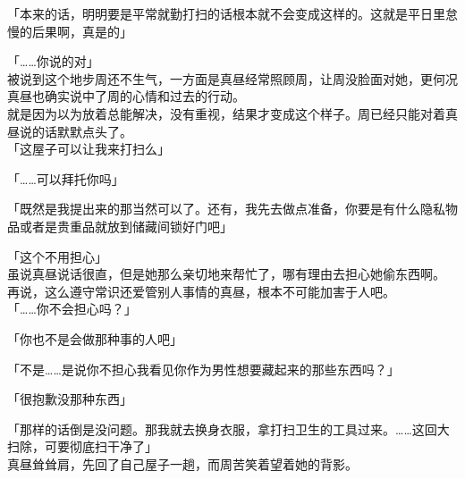 「本来的话，明明要是平常就勤打扫的话根本就不会变成这样的。这就是平日里怠慢的后果啊，真是的」

「……你说的对」\\

被说到这个地步周还不生气，一方面是真昼经常照顾周，让周没脸面对她，更何况真昼也确实说中了周的心情和过去的行动。\\

就是因为以为放着总能解决，没有重视，结果才变成这个样子。周已经只能对着真昼说的话默默点头了。\\

「这屋子可以让我来打扫么」

「……可以拜托你吗」

「既然是我提出来的那当然可以了。还有，我先去做点准备，你要是有什么隐私物品或者是贵重品就放到储藏间锁好门吧」

「这个不用担心」\\

虽说真昼说话很直，但是她那么亲切地来帮忙了，哪有理由去担心她偷东西啊。\\

再说，这么遵守常识还爱管别人事情的真昼，根本不可能加害于人吧。\\

「……你不会担心吗？」

「你也不是会做那种事的人吧」

「不是……是说你不担心我看见你作为男性想要藏起来的那些东西吗？」

「很抱歉没那种东西」

「那样的话倒是没问题。那我就去换身衣服，拿打扫卫生的工具过来。……这回大扫除，可要彻底扫干净了」\\

真昼耸耸肩，先回了自己屋子一趟，而周苦笑着望着她的背影。
